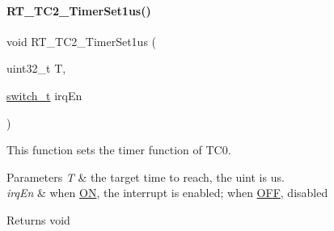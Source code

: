 \paragraph{\texorpdfstring{R\+T\+\_\+\+T\+C2\+\_\+\+Timer\+Set1us()}{RT\_TC2\_TimerSet1us()}}
{\footnotesize\ttfamily void R\+T\+\_\+\+T\+C2\+\_\+\+Timer\+Set1us (\begin{DoxyParamCaption}\item[{uint32\+\_\+t}]{T,  }\item[{\mbox{\hyperlink{a00020_ab43e533f3793920486fb81c580f71564}{switch\+\_\+t}}}]{irq\+En }\end{DoxyParamCaption})\hspace{0.3cm}{\ttfamily [inline]}}



This function sets the timer function of T\+C0. 


\begin{DoxyParams}{Parameters}
{\em T} & the target time to reach, the uint is us. \\
\hline
{\em irq\+En} & when \mbox{\hyperlink{a00020_ab43e533f3793920486fb81c580f71564a977d478dacaae531f95695750d1e9d03}{ON}}, the interrupt is enabled; when \mbox{\hyperlink{a00020_ab43e533f3793920486fb81c580f71564aac132f2982b98bcaa3445e535a03ff75}{O\+FF}}, disabled \\
\hline
\end{DoxyParams}
\begin{DoxyReturn}{Returns}
void 
\end{DoxyReturn}
